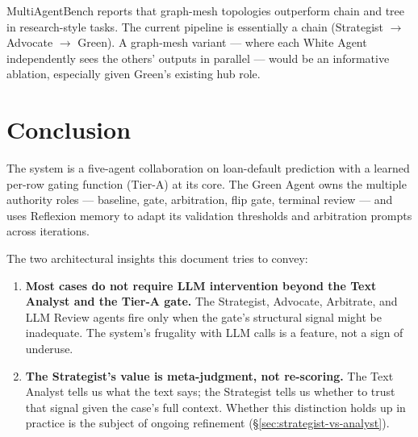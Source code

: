 \documentclass[11pt,a4paper]{article}
\begin{document}
MultiAgentBench reports that graph-mesh topologies outperform chain and
tree in research-style tasks. The current pipeline is essentially a chain
(Strategist $\to$ Advocate $\to$ Green). A graph-mesh variant --- where
each White Agent independently sees the others' outputs in parallel ---
would be an informative ablation, especially given Green's existing hub
role.

\section{Conclusion}

The system is a five-agent collaboration on loan-default prediction with
a learned per-row gating function (Tier-A) at its core. The Green Agent
owns the multiple authority roles --- baseline, gate, arbitration, flip
gate, terminal review --- and uses Reflexion memory to adapt its
validation thresholds and arbitration prompts across iterations.

The two architectural insights this document tries to convey:

\begin{enumerate}[itemsep=0pt]
    \item \textbf{Most cases do not require LLM intervention beyond the
    Text Analyst and the Tier-A gate.} The Strategist, Advocate,
    Arbitrate, and LLM Review agents fire only when the gate's
    structural signal might be inadequate. The system's frugality with
    LLM calls is a feature, not a sign of underuse.

    \item \textbf{The Strategist's value is meta-judgment, not re-scoring.}
    The Text Analyst tells us what the text says; the Strategist tells us
    whether to trust that signal given the case's full context. Whether
    this distinction holds up in practice is the subject of ongoing
    refinement (\S\ref{sec:strategist-vs-analyst}).
\end{enumerate}
\end{document}
